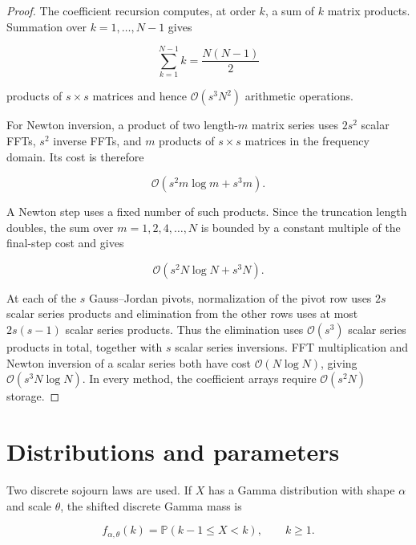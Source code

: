 \documentclass[3p,12pt,authoryear]{elsarticle}
\theoremstyle{definition}
\theoremstyle{remark}
\begin{document}
\begin{proof}
The coefficient recursion computes, at order $k$, a sum of $k$ matrix products. Summation over $k=1,\ldots,N-1$ gives

\begin{equation*}
\sum_{k=1}^{N-1}k=\frac{N(N-1)}{2}
\end{equation*}

products of $s\times s$ matrices and hence $\mathcal O(s^3N^2)$ arithmetic operations.

For Newton inversion, a product of two length-$m$ matrix series uses $2s^2$ scalar FFTs, $s^2$ inverse FFTs, and $m$ products of $s\times s$ matrices in the frequency domain. Its cost is therefore

\begin{equation*}
\mathcal O(s^2m\log m+s^3m).
\end{equation*}

A Newton step uses a fixed number of such products. Since the truncation length doubles, the sum over $m=1,2,4,\ldots,N$ is bounded by a constant multiple of the final-step cost and gives

\begin{equation*}
\mathcal O(s^2N\log N+s^3N).
\end{equation*}

At each of the $s$ Gauss--Jordan pivots, normalization of the pivot row uses $2s$ scalar series products and elimination from the other rows uses at most $2s(s-1)$ scalar series products. Thus the elimination uses $\mathcal O(s^3)$ scalar series products in total, together with $s$ scalar series inversions. FFT multiplication and Newton inversion of a scalar series both have cost $\mathcal O(N\log N)$, giving $\mathcal O(s^3N\log N)$. In every method, the coefficient arrays require $\mathcal O(s^2N)$ storage.
\end{proof}


\section{Distributions and parameters}\label{app:parameters}

Two discrete sojourn laws are used. If $X$ has a Gamma distribution with shape $\alpha$ and scale $\theta$, the shifted discrete Gamma mass is

\begin{equation*}
f_{\alpha,\theta}(k)
=
\mathbb P(k-1\leq X<k),
\qquad k\geq1.
\end{equation*}
\end{document}
